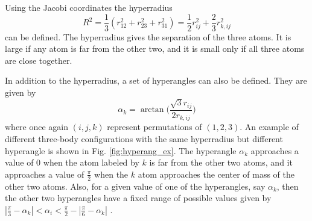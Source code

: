 \documentclass[prl,onecolumn,amsmath,amssymb,titlepage,nofootinbib,preprint]{revtex4-1}
\begin{document}
 Using the Jacobi coordinates the hyperradius
	\begin{equation}
		R^{2}=\frac{1}{3}(r^{2}_{12}+r^{2}_{23}+r^{2}_{31})=\frac{1}{2}r^{2}_{ij}+\frac{2}
		{3}r^{2}_{k,ij}
	\end{equation}
can be defined.  The hyperradius gives the separation of the three atoms. It is large if any atom is far from the other two, and it is small only if all three atoms are close together.

In addition to the hyperradius, a set of hyperangles can also be defined.  They are given by
	\begin{equation}\label{eq:hyperangle_def}
		\alpha_{k}=\arctan\bigg(\frac{\sqrt{3}r_{ij}}{2r_{k,ij}}\bigg)
	\end{equation}
where once again $(i,j,k)$ represent permutations of $(1,2,3)$.  An example of different three-body configurations with the same hyperradius but different hyperangle is shown in Fig. \ref{fig:hyperang_ex}.  The hyperangle $\alpha_{k}$ approaches a value of 0 when the atom labeled by $k$ is far from the other two atoms, and it approaches a value of $\frac{\pi}{2}$ when the $k$ atom approaches the center of mass of the other two atoms.  Also, for a given value of one of the hyperangles, say $\alpha_{k}$, then the other two hyperangles have a fixed range of possible values given by $|\frac{\pi}{3}-\alpha_{k}|<\alpha_{i}<\frac{\pi}{2}-|\frac{\pi}{6}-\alpha_{k}|$ \cite{Braaten_2006}.
\end{document}
